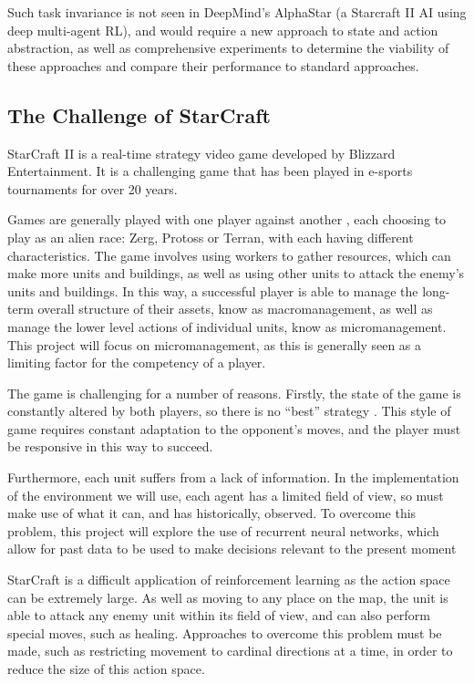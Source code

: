 Such task invariance is not seen in DeepMind's AlphaStar \cite{alphastar} (a Starcraft II AI using deep multi-agent RL), and would require a new approach to state and action abstraction, as well as comprehensive experiments to determine the viability of these approaches and compare their performance to standard approaches.


\subsection{The Challenge of StarCraft}

StarCraft II is a real-time strategy video game developed by Blizzard Entertainment. It is a challenging game that has been played in e-sports tournaments for over 20 years.

Games are generally played with one player against another , each choosing to play as an alien race: Zerg, Protoss or Terran, with each having different characteristics. The game involves using workers to gather resources, which can make more units and buildings, as well as using other units to attack the enemy's units and buildings. In this way, a successful player is able to manage the long-term overall structure of their assets, know as macromanagement, as well as manage the lower level actions of individual units, know as micromanagement. This project will focus on micromanagement, as this is generally seen as a limiting factor for the competency of a player.

The game is challenging for a number of reasons. Firstly, the state of the game is constantly altered by both players, so there is no ``best'' strategy . This style of game requires constant adaptation to the opponent's moves, and the player must be responsive in this way to succeed. 

Furthermore, each unit suffers from a lack of information. In the implementation of the environment we will use, each agent has a limited field of view, so must make use of what it can, and has historically, observed. To overcome this problem, this project will explore the use of recurrent neural networks, which allow for past data to be used to make decisions relevant to the present moment

StarCraft is a difficult application of reinforcement learning as the action space can be extremely large. As well as moving to any place on the map, the unit is able to attack any enemy unit within its field of view, and can also perform special moves, such as healing. Approaches to overcome this problem must be made, such as restricting movement to cardinal directions at a time, in order to reduce the size of this action space. 

